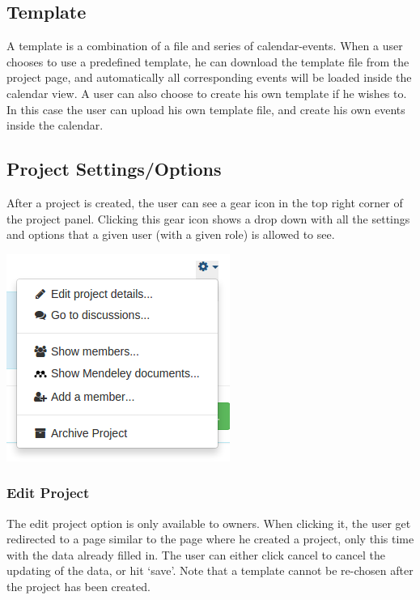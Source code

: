 \subsection{Template}

A template is a combination of a file and series of calendar-events. When a user chooses to use a predefined template, he can download the template file
from the project page, and automatically all corresponding events will be loaded inside the calendar view. A user can also choose to create his own 
template if he wishes to. In this case the user can upload his own template file, and create his own events inside the calendar.

\subsection{Project Settings/Options}

After a project is created, the user can see a gear icon in the top right corner of the project panel. Clicking this gear icon shows a drop down
with all the settings and options that a given user (with a given role) is allowed to see.

\begin{center}
\includegraphics[scale=0.5]{./img/project_dropdown.png}
\end{center}

\subsubsection{Edit Project}

The edit project option is only available to owners. When clicking it, the user get redirected to a page similar to the page where he created a project,
only this time with the data already filled in. The user can either click cancel to cancel the updating of the data, or hit `save'. Note
that a template cannot be re-chosen after the project has been created.

